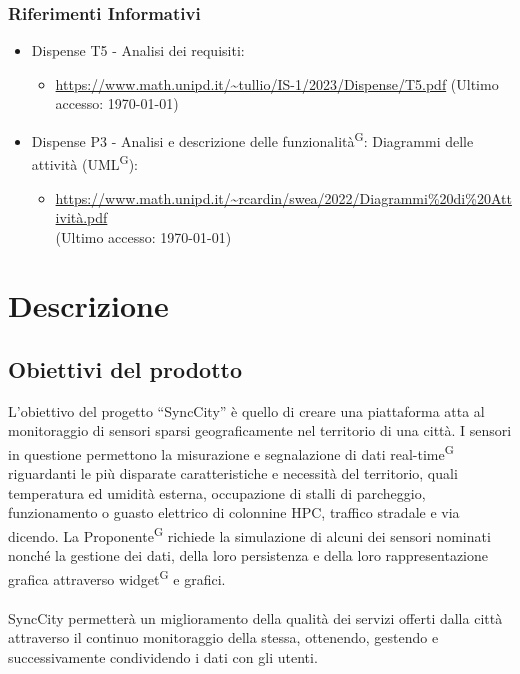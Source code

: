 \documentclass[8pt]{article}
\newcommand{\glossterm}[1]{#1\textsuperscript{G}} %
\begin{document}
\subsubsection{Riferimenti Informativi}
\begin{itemize}
	\setlength\itemsep{0em}
	\item Dispense T5 - Analisi dei requisiti:
    \begin{itemize}
        \item \href{https://www.math.unipd.it/~tullio/IS-1/2023/Dispense/T5.pdf}{https://www.math.unipd.it/\textasciitilde{}tullio/IS-1/2023/Dispense/T5.pdf} (Ultimo accesso: \today)
    \end{itemize}
    \item Dispense P3 - Analisi e descrizione delle \glossterm{funzionalità}: Diagrammi delle attività (\glossterm{UML}):
        \begin{itemize}
            \item
                \href{https://www.math.unipd.it/~rcardin/swea/2022/Diagrammi\%20di\%20Attivit\%C3\%A0.pdf}{https://www.math.unipd.it/\textasciitilde{}rcardin/swea/2022/Diagrammi\%20di\%20Attivit\`{a}.pdf}
                \\ (Ultimo accesso: \today)
        \end{itemize}
\end{itemize}
\newpage
\section{Descrizione}
\subsection{Obiettivi del prodotto}
L'obiettivo del progetto ``SyncCity'' è quello di creare una piattaforma atta al monitoraggio di sensori
sparsi geograficamente nel territorio di una città. I sensori in questione permettono la misurazione
e segnalazione di dati \glossterm{real-time} riguardanti le più disparate caratteristiche e necessità del
territorio, quali temperatura ed umidità esterna, occupazione di stalli di parcheggio, funzionamento
o guasto elettrico di colonnine HPC, traffico stradale e via dicendo. La \glossterm{Proponente} richiede la
simulazione di alcuni dei sensori nominati nonché la gestione dei dati, della loro persistenza e
della loro rappresentazione grafica attraverso \glossterm{widget} e grafici. \\\\SyncCity permetterà un miglioramento della qualità dei servizi offerti dalla città attraverso il continuo monitoraggio della stessa, ottenendo, gestendo e successivamente condividendo i dati con gli utenti. 
\end{document}
